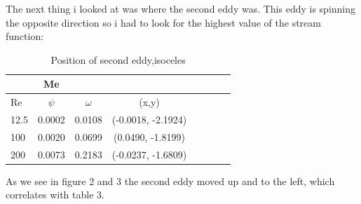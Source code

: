 \documentclass[a4paper,norsk]{article}
\begin{document}
The next thing i looked at was where the second eddy was. This eddy is spinning the opposite direction so i had to look for the highest value of the stream function:
\newline
\begin{table}
  \centering%
  \begin{tabular}{l*{6}{c}r}
   & Me\\
   \hline 
  	Re & $\psi$ & $\omega$& (x,y)   \\
	12.5 & 0.0002 & 0.0108 & (-0.0018, -2.1924)\\
	100 & 0.0020 & 0.0699  & (0.0490, -1.8199)\\
	200 &  0.0073 & 0.2183 & (-0.0237, -1.6809)\\
	\hline
 \end{tabular}
  \caption{Position of second eddy,isoceles }\label{table:second eddy}
\end{table}
\newline
As we see in figure 2 and 3 the second eddy moved up and to the left, which correlates with table 3.
\newline
\end{document}

